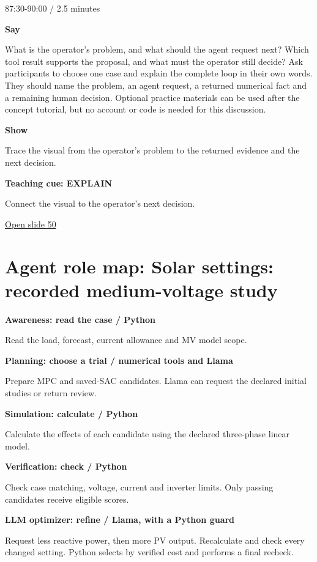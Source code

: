 \documentclass[12pt,letterpaper]{article}
\begin{document}
{\small\color{Slate} 87:30-90:00 /\allowbreak{} 2.5 minutes\par}\medskip
\textbf{Say}\par What is the operator's problem, and what should the agent request next? Which tool result supports the proposal, and what must the operator still decide? Ask participants to choose one case and explain the complete loop in their own words. They should name the problem, an agent request, a returned numerical fact and a remaining human decision. Optional practice materials can be used after the concept tutorial, but no account or code is needed for this discussion.\par\medskip
\textbf{Show}\par Trace the visual from the operator's problem to the returned evidence and the next decision.\par\medskip
\textbf{Teaching cue: EXPLAIN}\par Connect the visual to the operator's next decision.\par\medskip
\vfill\href{https://alaaselim-sudo.github.io/GridGuard-Agentic-AI-Tutorials/operator-cases/#/50}{Open slide 50}\par
\clearpage\section*{Agent role map: Solar settings: recorded medium-voltage study}
\textbf{Awareness: read the case /\allowbreak{} Python}\par Read the load, forecast, current allowance and MV model scope.\par\medskip
\textbf{Planning: choose a trial /\allowbreak{} numerical tools and Llama}\par Prepare MPC and saved-SAC candidates. Llama can request the declared initial studies or return review.\par\medskip
\textbf{Simulation: calculate /\allowbreak{} Python}\par Calculate the effects of each candidate using the declared three-phase linear model.\par\medskip
\textbf{Verification: check /\allowbreak{} Python}\par Check case matching, voltage, current and inverter limits. Only passing candidates receive eligible scores.\par\medskip
\textbf{LLM optimizer: refine /\allowbreak{} Llama, with a Python guard}\par Request less reactive power, then more PV output. Recalculate and check every changed setting. Python selects by verified cost and performs a final recheck.\par\medskip
\end{document}
